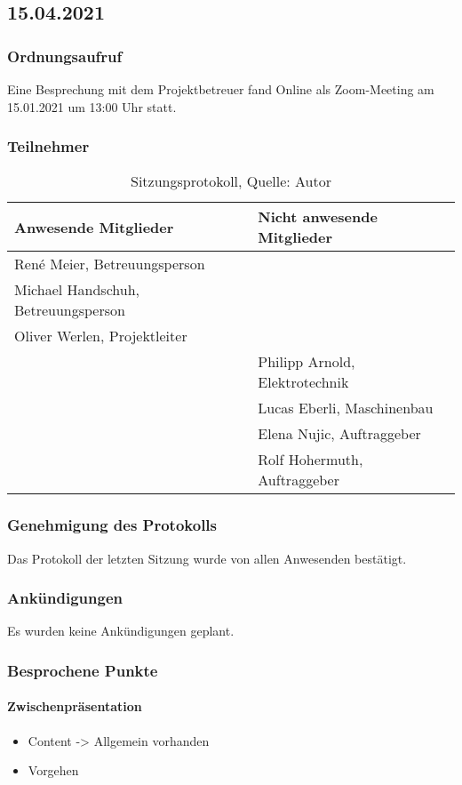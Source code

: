 \subsection{15.04.2021}
\subsubsection{Ordnungsaufruf}
Eine Besprechung mit dem Projektbetreuer fand Online als Zoom-Meeting am 15.01.2021 um 13:00 Uhr statt.
\subsubsection{Teilnehmer}
\begin{table}[H]
	\setlength\extrarowheight{2pt} %
	\begin{tabularx}{\textwidth}{|X|X|}
		\hline
		\textbf{Anwesende Mitglieder} &  \textbf{Nicht anwesende Mitglieder} \\
		\hline
		 René Meier, Betreuungsperson &  \\
		 Michael Handschuh, Betreuungsperson &   \\
		Oliver Werlen, Projektleiter &  \\
		& Philipp Arnold, Elektrotechnik  \\
		& Lucas Eberli, Maschinenbau \\
		& Elena Nujic, Auftraggeber  \\
		& Rolf Hohermuth, Auftraggeber  \\
		\hline
	\end{tabularx}
	\caption{ \label{tbl: Teilnehmerliste vom 15.04.2021}Sitzungsprotokoll, Quelle: Autor}
\end{table}
\subsubsection{Genehmigung des Protokolls}
Das Protokoll der letzten Sitzung wurde von allen Anwesenden bestätigt.
\subsubsection{Ankündigungen}
Es wurden keine Ankündigungen geplant.
\subsubsection{Besprochene Punkte}
\paragraph{Zwischenpräsentation}
\begin{itemize}
	\item Content -> Allgemein vorhanden
	\item Vorgehen 
\end{itemize}

